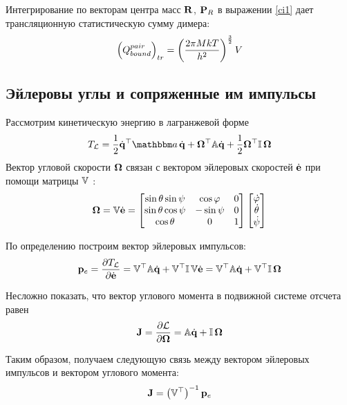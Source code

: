 Интегрирование по векторам центра масс $\mathbf{R}$, $\mathbf{P}_R$ в выражении \eqref{ci1} дает трансляционную статистическую сумму димера:
\vverh
\begin{gather}
	\left( Q_{bound}^{pair} \right)_{tr} = \left( \frac{2 \pi M k T}{h^2} \right)^{\frac{3}{2}} V \notag
\end{gather}

\subsection{Эйлеровы углы и сопряженные им импульсы}
Рассмотрим кинетическую энергию в лагранжевой форме
\vverh
\begin{gather}
	T_\mL = \frac{1}{2} \dot{\mf{q}}^\top \bba \, \dot{\mf{q}} + \mf{\Omega}^\top \bbA \dot{\mf{q}} + \frac{1}{2} \mf{\Omega}^\top \bbI \, \mf{\Omega} \notag
\end{gather}
Вектор угловой скорости $\mathbf{\Omega}$ связан с вектором эйлеровых скоростей $\dot{\mathbf{e}}$ при помощи матрицы $\mathbb{V}$ \cite{goldstein}:
\begin{gather}
\mathbf{\Omega} = \mathbb{V} \dot{\mathbf{e}} = 
\begin{bmatrix}
\sin \theta \sin \psi & \cos \varphi & 0 \\
\sin \theta \cos \psi & - \sin \psi & 0 \\
\cos \theta & 0 & 1
\end{bmatrix}
\begin{bmatrix}
\dot{\varphi} \\
\dot{\theta} \\
\dot{\psi}
\end{bmatrix} \notag 
\end{gather}

По определению построим вектор эйлеровых импульсов:
\vverh
\begin{gather}
	\mathbf{p}_e = \frac{\partial T_{\mathcal{L}}}{\partial \dot{\mathbf{e}}} = \mathbb{V}^\top \mathbb{A} \dot{\mathbf{q}} + \mathbb{V}^\top \mathbb{I} \, \mathbb{V} \dot{\mathbf{e}} = \mathbb{V}^\top \mathbb{A} \dot{\mathbf{q}} + \mathbb{V}^\top \mathbb{I} \, \mathbf{\Omega} \notag
\end{gather}

Несложно показать, что вектор углового момента в подвижной системе отсчета равен
\vverh
\begin{gather}
	\mathbf{J} = \frac{\partial \mathcal{L}}{\partial \mathbf{\Omega}} = \mathbb{A} \dot{\mathbf{q}} + \mathbb{I} \, \mathbf{\Omega} \notag
\end{gather}

Таким образом, получаем следующую связь между вектором эйлеровых импульсов и вектором углового момента:
\vverh
\begin{gather}
	\mathbf{J} = \left( \mathbb{V}^\top \right)^{-1} \mathbf{p}_e \notag
\end{gather}

